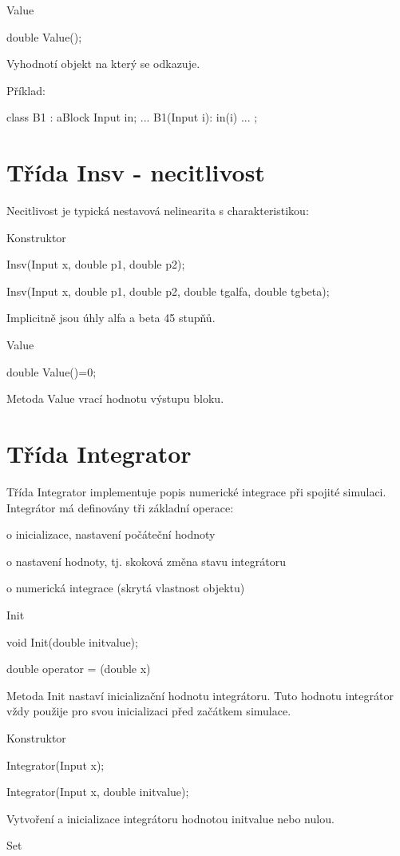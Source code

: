 \documentclass[a4paper]{article}
\begin{document}
Value

  double Value();


Vyhodnotí objekt na který se odkazuje.

Příklad:

  class B1 : aBlock {
    Input in;
     ...
    B1(Input i): in(i) {}
     ...
  };

\section{Třída Insv - necitlivost}

Necitlivost je typická nestavová nelinearita s charakteristikou:


Konstruktor

  Insv(Input x, double p1, double p2);

  Insv(Input x, double p1, double p2, double tgalfa, double tgbeta);


Implicitně jsou úhly alfa a beta 45 stupňů.


Value

  double Value()=0;


Metoda Value vrací hodnotu výstupu bloku.


\section{Třída Integrator}

Třída Integrator implementuje popis numerické integrace při spojité
simulaci. Integrátor má definovány tři základní operace:


 o  inicializace, nastavení počáteční hodnoty

 o  nastavení hodnoty, tj. skoková změna stavu integrátoru

 o  numerická integrace (skrytá vlastnost objektu)


Init

  void Init(double initvalue);

  double operator = (double x)


Metoda Init nastaví inicializační hodnotu integrátoru. Tuto
hodnotu integrátor vždy použije pro svou inicializaci před začátkem
simulace.


Konstruktor

  Integrator(Input x);

  Integrator(Input x, double initvalue);


Vytvoření a inicializace integrátoru hodnotou initvalue nebo
nulou.


Set
\end{document}

